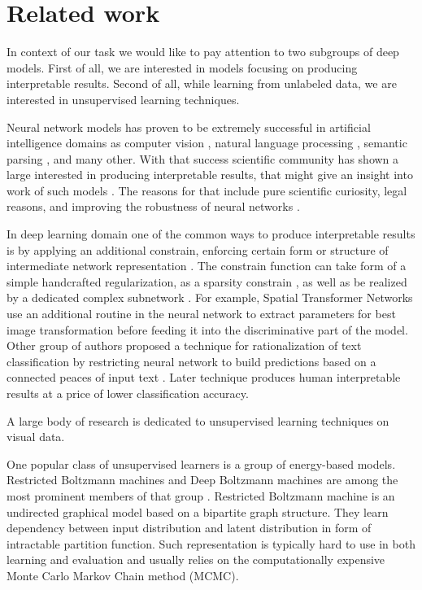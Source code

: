 
\chapter{Related work}\label{ch:rewo}

In context of our task we would like to pay attention to two subgroups of deep models.
First of all, we are interested in models focusing on producing interpretable results.
Second of all, while learning from unlabeled data, we are interested in unsupervised learning techniques.

Neural network models has proven to be extremely successful in artificial intelligence domains as computer vision \cite{ILSVRC15}, natural language processing \cite{NIPS2013_5021}, semantic parsing \cite{bordes2012}, and many other.
With that success scientific community has shown a large interested in producing interpretable results, that might give an insight into work of such models \cite{Yosinski2015, Mahendran2014, Zeiler2014, Lei2016}.
The reasons for that include pure scientific curiosity, legal reasons, and improving the robustness of neural networks \cite{Goodfellow2015}.

In deep learning domain one of the common ways to produce interpretable results is by applying an additional constrain, enforcing certain form or structure of intermediate network representation  \cite{Jaderberg2015, Lei2016, Kulkarni2015}.
The constrain function can take form of a simple handcrafted regularization, as a sparsity constrain \cite{Ng2011}, as well as be realized by a dedicated complex subnetwork \cite{Lei2016, Li2015}.
For example, Spatial Transformer Networks \cite{Jaderberg2015} use an additional routine in the neural network to extract parameters for best image transformation before feeding it into the discriminative part of the model.
Other group of authors proposed a technique for rationalization of text classification by restricting neural network to build predictions based on a connected peaces of input text \cite{Lei2016}.
Later technique produces human interpretable results at a price of lower classification accuracy.

A large body of research is dedicated to unsupervised learning techniques on visual data.

One popular class of unsupervised learners is a group of energy-based models.
Restricted Boltzmann machines and Deep Boltzmann machines are among the most prominent members of that group \cite{Ackley1985, Salakhutdinov2009}.
Restricted Boltzmann machine is an undirected graphical model based on a bipartite graph structure.
They learn dependency between input distribution and latent distribution in form of intractable partition function.
Such representation is typically hard to use in both learning and evaluation and usually relies on the computationally expensive Monte Carlo Markov Chain method (MCMC).

